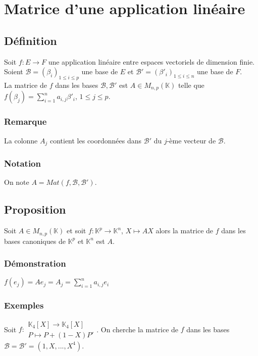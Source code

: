 \documentclass[a4paper,10pt]{book} %
\newcommand{\K}{\mathbb{K}}
\newcommand{\B}{\mathcal{B}}
\begin{document}
\newpage

\section{Matrice d'une application linéaire}
\subsection{Définition}
Soit $f:E\rightarrow F$ une application linéaire entre espaces vectoriels de dimension finie.\\
Soient $\B=(\beta_i)_{1\leq i\leq p}$ une base de $E$ et $\B'=(\beta'_i)_{1\leq i\leq n}$ une base de $F$.\\
La matrice de $f$ dans les bases $\B,\B'$ est $A\in M_{n,p}(\K)$ telle que $f(\beta_j)=\sum\limits_{i=1}^n a_{i,j}\beta'_i$, $1\leq j\leq p$.

\subsubsection{Remarque}
La colonne $A_j$ contient les coordonnées dans $\B'$ du $j$-ème vecteur de $\B$.

\subsubsection{Notation}
On note $A=Mat(f,\B,\B')$.

\subsection{Proposition}
Soit $A\in M_{n,p}(\K)$ et soit $f:\K^p\rightarrow \K^n$, $X\mapsto AX$ alors la matrice de $f$ dans les\\
bases canoniques de $\K^p$ et $\K^n$ est $A$.

\subsubsection{Démonstration}
$f(e_j)=Ae_j=A_j=\displaystyle\sum\limits_{i=1}^na_{i,j}e_i$

\subsubsection{Exemples}
Soit $f:\begin{matrix} \K_4[X]\rightarrow \K_4[X]\\P\mapsto P+(1-X)P'\end{matrix}$. On cherche la matrice de $f$ dans les bases $\B=\B'=(1,X,...,X^4)$.\\
\end{document}
